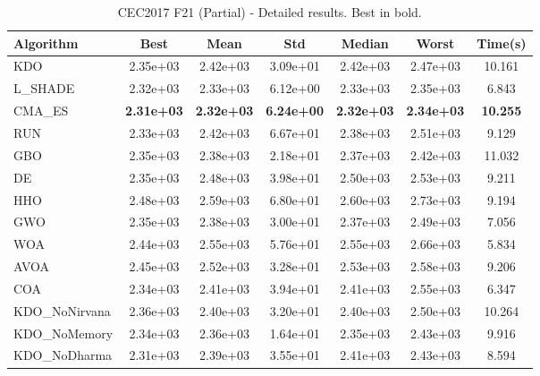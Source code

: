 \begin{table}[H]
\centering\small
\caption{CEC2017 F21 (Partial) - Detailed results. Best in bold.}
\label{tab:cec2017_F21}
\begin{tabular}{lcccccc}
\toprule
\textbf{Algorithm} & \textbf{Best} & \textbf{Mean} & \textbf{Std} & \textbf{Median} & \textbf{Worst} & \textbf{Time(s)} \\
\midrule
KDO & 2.35e+03 & 2.42e+03 & 3.09e+01 & 2.42e+03 & 2.47e+03 & 10.161 \\
L_SHADE & 2.32e+03 & 2.33e+03 & 6.12e+00 & 2.33e+03 & 2.35e+03 & 6.843 \\
CMA_ES & \textbf{2.31e+03} & \textbf{2.32e+03} & \textbf{6.24e+00} & \textbf{2.32e+03} & \textbf{2.34e+03} & \textbf{10.255} \\
RUN & 2.33e+03 & 2.42e+03 & 6.67e+01 & 2.38e+03 & 2.51e+03 & 9.129 \\
GBO & 2.35e+03 & 2.38e+03 & 2.18e+01 & 2.37e+03 & 2.42e+03 & 11.032 \\
DE & 2.35e+03 & 2.48e+03 & 3.98e+01 & 2.50e+03 & 2.53e+03 & 9.211 \\
HHO & 2.48e+03 & 2.59e+03 & 6.80e+01 & 2.60e+03 & 2.73e+03 & 9.194 \\
GWO & 2.35e+03 & 2.38e+03 & 3.00e+01 & 2.37e+03 & 2.49e+03 & 7.056 \\
WOA & 2.44e+03 & 2.55e+03 & 5.76e+01 & 2.55e+03 & 2.66e+03 & 5.834 \\
AVOA & 2.45e+03 & 2.52e+03 & 3.28e+01 & 2.53e+03 & 2.58e+03 & 9.206 \\
COA & 2.34e+03 & 2.41e+03 & 3.94e+01 & 2.41e+03 & 2.55e+03 & 6.347 \\
KDO_NoNirvana & 2.36e+03 & 2.40e+03 & 3.20e+01 & 2.40e+03 & 2.50e+03 & 10.264 \\
KDO_NoMemory & 2.34e+03 & 2.36e+03 & 1.64e+01 & 2.35e+03 & 2.43e+03 & 9.916 \\
KDO_NoDharma & 2.31e+03 & 2.39e+03 & 3.55e+01 & 2.41e+03 & 2.43e+03 & 8.594 \\
\bottomrule
\end{tabular}
\end{table}
